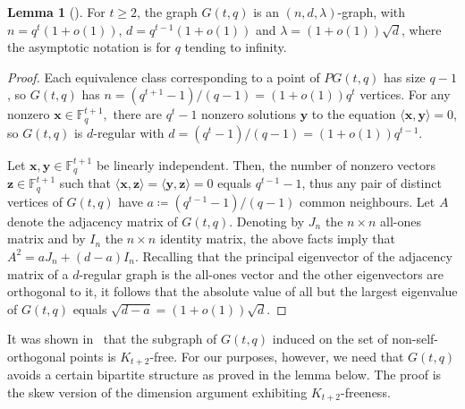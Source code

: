 \documentclass{article}
\theoremstyle{plain}
\newtheorem{lemma}[theorem]{Lemma}
\theoremstyle{definition}
\newtheorem{lemma}{Lemma}
\newcommand{\bF}{\mathbb{F}}
\newcommand{\bx}{\mathbf{x}}
\newcommand{\by}{\mathbf{y}}
\newcommand{\bz}{\mathbf{z}}
\begin{document}
\begin{lemma}[\cite{alon-krivelevich}] \label{lem:properties}
    For $t \ge 2$, the graph $G(t, q)$ is an $(n, d, \lambda)$-graph, with $n = q^t (1 + o(1))$, $d = q^{t-1}(1 + o(1))$ and $\lambda = (1+o(1)) \sqrt{d}$, where the asymptotic notation is for $q$ tending to infinity.
\end{lemma}
\begin{proof}
    Each equivalence class corresponding to a point of $PG(t, q)$ has size $q-1$, so $G(t,q)$ has $n = (q^{t+1} - 1) / (q-1) = (1+o(1)) q^t$ vertices. For any nonzero $\bx \in \bF_q^{t+1},$ there are $q^t - 1$ nonzero solutions $\by$ to the equation $\langle \bx, \by \rangle = 0$, so $G(t,q)$ is $d$-regular with $d = (q^t - 1) / (q-1) = (1+o(1))q^{t-1}.$

    Let $\bx, \by \in \bF_q^{t+1}$ be linearly independent. Then, the number of nonzero vectors $\bz \in \bF_q^{t+1}$ such that $\langle \bx, \bz \rangle = \langle \by, \bz \rangle = 0$ equals $q^{t-1} - 1$, thus any pair of distinct vertices of $G(t,q)$ have $a \coloneqq (q^{t-1} - 1) / (q-1)$ common neighbours. Let $A$ denote the adjacency matrix of $G(t, q)$. Denoting by $J_n$ the $n \times n$ all-ones matrix and by $I_n$ the $n \times n$ identity matrix, the above facts imply that $A^2 = aJ_n + (d-a)I_n.$ Recalling that the principal eigenvector of the adjacency matrix of a $d$-regular graph is the all-ones vector and the other eigenvectors are orthogonal to it, it follows that the absolute value of all but the largest eigenvalue of $G(t,q)$ equals $\sqrt{d-a} = (1+o(1)) \sqrt{d}.$
\end{proof}

It was shown in~\cite{alon-krivelevich} that the subgraph of $G(t, q)$ induced on the set of non-self-orthogonal points is $K_{t+2}$-free. For our purposes, however, we need that $G(t, q)$ avoids a certain bipartite structure as proved in the lemma below. The proof is the skew version of the dimension argument exhibiting $K_{t+2}$-freeness.
\end{document}
